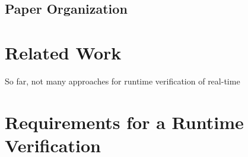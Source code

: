 \documentclass[]{llncs}
\begin{document}
\subsection{Paper Organization}


\section{Related Work}
\label{sec:relatedwork}


So far, not many approaches for runtime verification of real-time

\section{Requirements for a Runtime Verification}
\cite{Lakhneche:1995:MTL:202379.202389}




\end{document}
